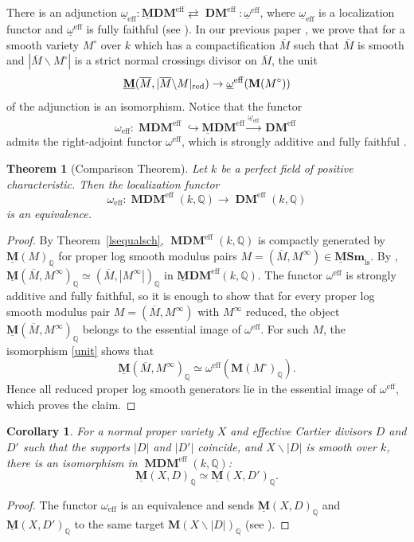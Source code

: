 \documentclass[11pt]{amsart}
\newcommand{\Q}{\mathbb{Q}}
\newcommand{\ul}[1]{{\underline{#1}}}
\newcommand{\DM}{\operatorname{\mathbf{DM}}}
\newcommand{\MDM}{\operatorname{\mathbf{MDM}}}
\newcommand{\ulMDM}{\operatorname{\mathbf{\underline{M}DM}}}
\newcommand{\eff}{{\operatorname{eff}}}
\newcommand{\red}{{\operatorname{red}}}
\newcommand{\ol}{\overline}
\newcommand{\M}{\mathbf{M}}
\newcommand{\ulM}{\underline{\M}}
\newcommand{\ulMSm}{\operatorname{\mathbf{\underline{M}Sm}}}
\def\Minf{M^{\infty}}
\newcommand{\ulMSmls}{{\ulMSm}_{\text{ls}}}
\newtheorem{thm}[lemma]{Theorem}
\newtheorem{cor}[lemma]{Corollary}
\theoremstyle{definition}
\theoremstyle{remark}
\numberwithin{equation}{section}
\begin{document}
There is an adjunction $\ul{\omega}_{\eff}:\ulMDM^\eff \rightleftarrows\DM^{\eff}:\ul{\omega}^\eff$, where $\ul{\omega}_{\eff}$ is a localization functor and $\ul{\omega}^\eff$ is fully faithful (see \cite[Section 6]{KMSY22a}). In our previous paper \cite[Theorem~7.1]{M22}, we prove that for a smooth variety $M^\circ$ over $k$ which has a compactification $\ol{M}$ such that $\ol{M}$ is smooth and $|\ol{M}\backslash M^\circ|$ is a strict normal crossings divisor on $\ol{M}$, the unit
\begin{equation}\label{unit}
\ulM(\ol{M},|\ol{M}\backslash M|_{\red}) \to \ul{\omega}^{\eff}({\bf{M}}(M^\circ))
\end{equation}
of the adjunction is an isomorphism. Notice that the functor 
\[
\omega_\eff:\MDM^\eff \hookrightarrow \ulMDM^\eff \overset{\ul{\omega}_\eff}{\to} \DM^\eff
\]
admits the right-adjoint functor $\omega^\eff$, which is strongly additive and fully faithful \cite[Proposition 6.1.2]{KMSY22a}.

    \begin{thm}[Comparison Theorem]\label{mainmainmain}
    Let $k$ be a perfect field of positive characteristic. Then the localization functor
    \[
    \omega_\eff:\MDM^\eff(k,\Q) \to \DM^\eff(k,\Q)
    \]
    is an equivalence.
\end{thm}
\begin{proof}
By Theorem~\ref{lsequalsch}, $\MDM^\eff(k,\Q)$ is compactly generated by $\ulM(M)_{\Q}$ for proper log smooth modulus pairs $M=(\ol{M},\Minf) \in \ulMSmls$. By \cite[Corollary 8.8]{M22}, $\ulM(\ol{M},\Minf)_\Q \simeq (\ol{M},|\Minf|)_\Q$ in $\ulMDM^\eff(k,\Q)$. The functor $\omega^\eff$ is strongly additive and fully faithful, so it is enough to show that for every proper log smooth modulus pair $M=(\ol{M},M^\infty)$ with $M^\infty$ reduced, the object $\ulM(\ol{M},M^\infty)_{\Q}$ belongs to the essential image of $\omega^\eff$. For such $M$, the isomorphism \eqref{unit} shows that
\[
\ulM(\ol{M},M^\infty)_{\Q}\simeq \omega^\eff(\mathbf{M}(M^\circ)_{\Q}).
\]
Hence all reduced proper log smooth generators lie in the essential image of $\omega^\eff$, which proves the claim.\end{proof}
\begin{cor}\label{corcorcor}
     For a normal proper variety $X$ and effective Cartier divisors $D$ and $D'$ such that the supports
$|D|$ and $|D'|$ coincide, and $X\backslash |D|$ is smooth over $k$, there is an isomorphism in $\MDM^\eff(k,\Q)$:
\[
\ulM(X,D)_{\Q} \simeq \ulM(X,D')_\Q.
\]
\end{cor}
\begin{proof}
    The functor $\omega_\eff$ is an equivalence and sends $\ulM(X,D)_{\Q}$ and $\ulM(X,D')_{\Q}$ to the same target $\textbf{M}(X\backslash |D|)_{\Q}$ (see \cite[Proposition 6.1.1]{KMSY22a}).
\end{proof}




\end{document}
